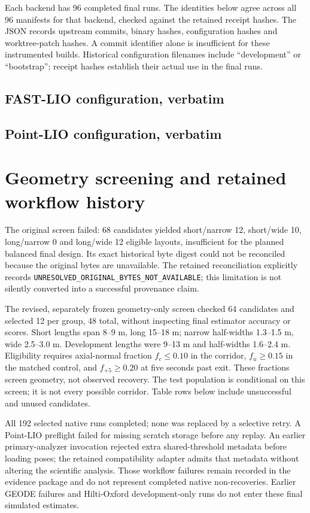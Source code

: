 \documentclass[conference,onecolumn]{IEEEtran}
\begin{document}
Each backend has 96 completed final runs. The identities below agree across
all 96 manifests for that backend, checked against the retained receipt hashes.
The JSON records upstream commits, binary hashes, configuration hashes and
worktree-patch hashes. A commit identifier alone is insufficient for these
instrumented builds. Historical configuration filenames include ``development''
or ``bootstrap''; receipt hashes establish their actual use in the final runs.

\subsection{FAST-LIO configuration, verbatim}

\subsection{Point-LIO configuration, verbatim}


\section{Geometry screening and retained workflow history}
The original screen failed: 68 candidates yielded short/narrow 12, short/wide 10,
long/narrow 0 and long/wide 12 eligible layouts, insufficient for the planned
balanced final design. Its exact historical byte digest could not be reconciled
because the original bytes are unavailable. The retained reconciliation explicitly
records \texttt{UNRESOLVED\_ORIGINAL\_BYTES\_NOT\_AVAILABLE}; this limitation
is not silently converted into a successful provenance claim.

The revised, separately frozen geometry-only screen checked 64 candidates and
selected 12 per group, 48 total, without inspecting final estimator accuracy or
scores. Short lengths span 8--9 m, long 15--18 m; narrow half-widths 1.3--1.5 m,
wide 2.5--3.0 m. Development lengths were 9--13 m and half-widths 1.6--2.4 m.
Eligibility requires axial-normal fraction $f_c\leq0.10$ in the corridor,
$f_u\geq0.15$ in the matched control, and $f_{+5}\geq0.20$ at five seconds
past exit. These fractions screen geometry, not observed recovery.
The test population is conditional on this screen; it is not every possible corridor.
Table rows below include unsuccessful and unused candidates.


All 192 selected native runs completed; none was replaced by a selective retry.
A Point-LIO preflight failed for missing scratch storage before any replay.
An earlier primary-analyzer invocation rejected extra shared-threshold metadata
before loading poses; the retained compatibility adapter admits that metadata
without altering the scientific analysis. Those workflow failures remain recorded
in the evidence package and do not represent completed native non-recoveries.
Earlier GEODE failures and Hilti-Oxford development-only runs do not enter these
final simulated estimates.
\end{document}
